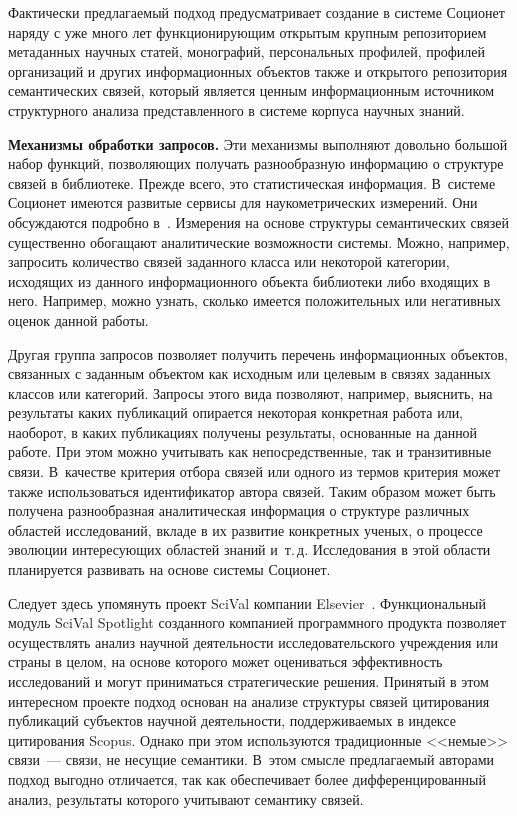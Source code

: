 \begin{multicols}{2}
  Фактически предлагаемый подход предусматривает создание в сис\-те\-ме 
Соционет наряду с уже много лет функционирующим открытым крупным 
репозиторием метаданных научных статей, монографий, персональных 
профилей, профилей организаций и других информационных объектов также и 
открытого репозитория семантических связей, который является ценным 
информационным источником структурного анализа представленного в 
системе корпуса научных знаний. 
  
  \smallskip
  
  \textbf{Механизмы обработки запросов.} Эти механизмы выполняют 
довольно большой набор функций, позволяющих получать разнообразную 
информацию о структуре связей в библиотеке. Прежде всего, это 
статистическая информация. В~системе Соционет имеются развитые сервисы 
для нау\-ко\-мет\-ри\-че\-ских измерений. Они обсуждаются подробно 
  в~\cite{8-kog, 27-kog}. Измерения на основе структуры семантических связей 
существенно обогащают аналитические возможности системы. Можно, 
например, запросить количество связей заданного класса или некоторой 
категории, исходящих из данного информационного объекта библиотеки либо 
входящих в него. Например, можно узнать, сколько имеется положительных 
или негативных оценок данной работы. 
  
  Другая группа запросов позволяет получить перечень информационных 
объектов, связанных с заданным объектом как исходным или целевым в связях 
заданных классов или категорий. Запросы этого вида позволяют, например, 
выяснить, на результаты каких публикаций опирается некоторая конкретная 
работа или, наоборот, в каких публикациях получены результаты, основанные 
на данной работе. При этом можно учитывать как непосредственные, так и 
транзитивные связи. В~качестве критерия отбора связей или одного из термов 
критерия может также использоваться идентификатор автора связей. Таким 
образом может быть получена разнообразная аналитическая информация о 
структуре различных областей исследований, вкладе в их развитие конкретных 
ученых, о процессе эволюции интересующих областей знаний и~т.\,д. 
Исследования в этой области планируется развивать на основе системы 
Соционет. 
  
  Следует здесь упомянуть проект {SciVal} компании 
{Elsevier}~\cite{28-kog}. Функциональный модуль {SciVal Spotlight} 
созданного компанией программного продукта позволяет осуществлять анализ 
научной деятельности исследовательского учреждения или страны в целом, на 
основе которого может оцениваться эффективность исследований и могут 
приниматься стратегические решения. Принятый в этом интересном проекте 
подход основан на анализе структуры связей цитирования публикаций 
субъектов научной деятельности, поддерживаемых в индексе цитирования 
Scopus. Однако при этом используются традиционные <<немые>> связи~--- 
связи, не несущие семантики. В~этом смысле пред\-ла\-га\-емый авторами подход 
выгодно отличается, так как обеспечивает более дифференцированный анализ, 
результаты которого учитывают семантику связей. 
  

\end{multicols}
